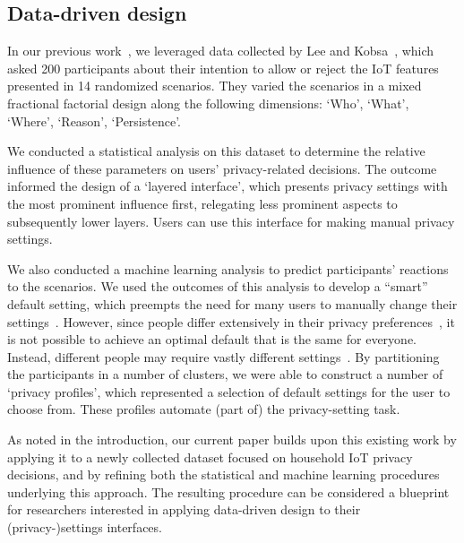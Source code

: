 \subsection{Data-driven design}
In our previous work~\cite{bahiratiui2018}, we leveraged data collected by Lee and Kobsa~\cite{lee2016understanding}, which asked 200 participants about their intention to allow or reject the IoT features presented in 14 randomized scenarios. They varied the scenarios in a mixed fractional factorial design along the following dimensions: `Who', `What', `Where', `Reason', `Persistence'.

We conducted a statistical analysis on this dataset to determine the relative influence of these parameters on users' privacy-related decisions. The outcome informed the design of a `layered interface', which presents privacy settings with the most prominent influence first, relegating less prominent aspects to subsequently lower layers. Users can use this interface for making manual privacy settings.

We also conducted a machine learning analysis to predict participants' reactions to the scenarios. We used the outcomes of this analysis to develop a ``smart'' default setting, which preempts the need for many users to manually change their settings~\cite{smith2013choice}. However, since people differ extensively in their privacy preferences~\cite{olson2005study}, it is not possible to achieve an optimal default that is the same for everyone. Instead, different people may require vastly different settings~\cite{knijnenburg2013dimensionality, olson2005study, wisniewski2017making}. By partitioning the participants in a number of clusters, we were able to construct a number of `privacy profiles', which represented a selection of default settings for the user to choose from. These profiles automate (part of) the privacy-setting task.

As noted in the introduction, our current paper builds upon this existing work by applying it to a newly collected dataset focused on household IoT privacy decisions, and by refining both the statistical and machine learning procedures underlying this approach. The resulting procedure can be considered a blueprint for researchers interested in applying data-driven design to their (privacy-)settings interfaces.


